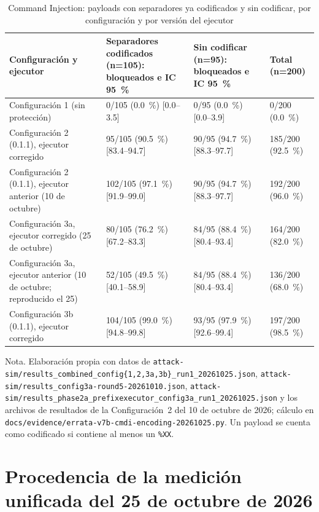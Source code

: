 \begin{table}[H]
\centering
\small
\begin{tabular}{|L{3.7cm}|L{3.6cm}|L{3.6cm}|L{2.5cm}|}
\hline
\textbf{Configuración y ejecutor} & \textbf{Separadores codificados (n=105): bloqueados e IC 95~\%} & \textbf{Sin codificar (n=95): bloqueados e IC 95~\%} & \textbf{Total (n=200)} \\ \hline
Configuración 1 (sin protección) & 0/105 (0.0~\%) [0.0--3.5] & 0/95 (0.0~\%) [0.0--3.9] & 0/200 (0.0~\%) \\ \hline
Configuración 2 (0.1.1), ejecutor corregido & 95/105 (90.5~\%) [83.4--94.7] & 90/95 (94.7~\%) [88.3--97.7] & 185/200 (92.5~\%) \\ \hline
Configuración 2 (0.1.1), ejecutor anterior (10 de octubre) & 102/105 (97.1~\%) [91.9--99.0] & 90/95 (94.7~\%) [88.3--97.7] & 192/200 (96.0~\%) \\ \hline
Configuración 3a, ejecutor corregido (25 de octubre) & 80/105 (76.2~\%) [67.2--83.3] & 84/95 (88.4~\%) [80.4--93.4] & 164/200 (82.0~\%) \\ \hline
Configuración 3a, ejecutor anterior (10 de octubre; reproducido el 25) & 52/105 (49.5~\%) [40.1--58.9] & 84/95 (88.4~\%) [80.4--93.4] & 136/200 (68.0~\%) \\ \hline
Configuración 3b (0.1.1), ejecutor corregido & 104/105 (99.0~\%) [94.8--99.8] & 93/95 (97.9~\%) [92.6--99.4] & 197/200 (98.5~\%) \\ \hline
\end{tabular}
\caption[Command Injection con separadores codificados y sin codificar]{Command Injection: payloads con separadores ya codificados y sin codificar, por configuración y por versión del ejecutor}
\label{tab:anx-cmdi-codificacion}
\end{table}
{\footnotesize Nota. Elaboración propia con datos de
\texttt{attack-sim/results\_combined\_config\{1,2,3a,3b\}\_run1\_20261025.json},
\texttt{attack-sim/results\_config3a-round5-20261010.json},
\texttt{attack-sim/results\_phase2a\_prefixexecutor\_config3a\_run1\_20261025.json} y los archivos
de resultados de la Configuración~2 del 10 de octubre de 2026; cálculo en
\texttt{docs/evidence/errata-v7b-cmdi-encoding-20261025.py}. Un payload se cuenta como codificado
si contiene al menos un \texttt{\%XX}.}

\section{Procedencia de la medición unificada del 25 de octubre de 2026}
\label{anx:ronda5-procedencia}

